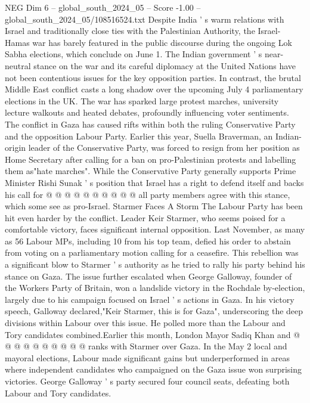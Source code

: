 \begin{textsample}{NEG Dim 6 – global\_south\_2024\_05 – Score -1.00 – global\_south\_2024\_05/108516524.txt}  \label{ex:f6_neg_240}
Despite India ' s warm relations with Israel and traditionally close ties with the Palestinian Authority, the Israel-Hamas war has barely featured in the public discourse during the ongoing Lok Sabha elections, which conclude on June 1.
The Indian government ' s near-neutral stance on the war and its careful diplomacy at the United Nations have not been contentious issues for the key opposition parties.
In contrast, the brutal Middle East conflict casts a long shadow over the upcoming July 4 parliamentary elections in the UK.
The war has sparked large protest marches, university lecture walkouts and heated debates, profoundly influencing voter sentiments.
The conflict in Gaza has caused rifts within both the ruling Conservative Party and the opposition Labour Party.
Earlier this year, Suella Braverman, an Indian-origin leader of the Conservative Party, was forced to resign from her position as Home Secretary after calling for a ban on pro-Palestinian protests and labelling them as"hate marches".
While the Conservative Party generally supports Prime Minister Rishi Sunak ' s position that Israel has a right to defend itself and backs his call for @ @ @ @ @ @ @ @ @ @ all party members agree with this stance, which some see as pro-Israel.
Starmer Faces A Storm The Labour Party has been hit even harder by the conflict.
Leader Keir Starmer, who seems poised for a comfortable victory, faces significant internal opposition.
Last November, as many as 56 Labour MPs, including 10 from his top team, defied his order to abstain from voting on a parliamentary motion calling for a ceasefire.
This rebellion was a significant blow to Starmer ' s authority as he tried to rally his party behind his stance on Gaza.
The issue further escalated when George Galloway, founder of the Workers Party of Britain, won a landslide victory in the Rochdale by-election, largely due to his campaign focused on Israel ' s actions in Gaza.
In his victory speech, Galloway declared,"Keir Starmer, this is for Gaza", underscoring the deep divisions within Labour over this issue.
He polled more than the Labour and Tory candidates combined.Earlier this month, London Mayor Sadiq Khan and @ @ @ @ @ @ @ @ @ @ ranks with Starmer over Gaza.
In the May 2 local and mayoral elections, Labour made significant gains but underperformed in areas where independent candidates who campaigned on the Gaza issue won surprising victories.
George Galloway ' s party secured four council seats, defeating both Labour and Tory candidates.

\end{textsample}
